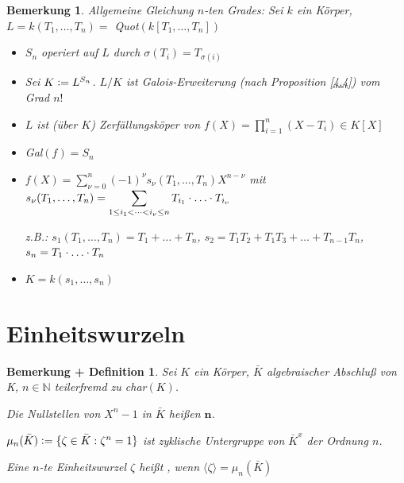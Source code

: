 \documentclass[a4paper,10pt,german]{scrbook}
\theoremstyle{saetze}
\theoremstyle{definitionen}
\newtheorem{Bem}[Def]{Bemerkung}
\newtheorem{BemDef}[Def]{Bemerkung + Definition}
\begin{document}
\begin{Bem}
Allgemeine Gleichung $n$-ten Grades: Sei $k$
ein Körper, $L = k(T_1,\dots,T_n) =$ Quot$(k[T_1,\dots,T_n])$

\begin{itemize}
\item $S_n$ operiert auf $L$ durch $\sigma(T_i) = T_{\sigma(i)}$

\item Sei $K\mathrel{\mathop:}= L^{S_n}$. $L/K$ ist Galois-Erweiterung (nach
Proposition \ref{4.4}) vom Grad $n!$

\item $L$ ist (über $K$) Zerfällungsköper von $f(X) =
\displaystyle \prod_{i=1}^n(X-T_i) \in K[X]$

\item Gal$(f) = S_n$

\item $f(X) = \displaystyle \sum_{\nu = 0}^n (-1)^{\nu} s_{\nu}
(T_1,\dots,T_n)X^{n-\nu}$ mit $s_{\nu}(T_1,\dots,T_n) =
\displaystyle \sum_{1\leq i_1 < \dots < i_{\nu} \leq n} T_{i_1} \cd \dots \cd 
T_{i_\nu}$

z.B.: $s_1(T_1,\dots,T_n) = T_1 + \dots + T_n$, $s_2 = T_1 T_2 + T_1
T_3 + \dots + T_{n-1}T_n$, $s_n = T_1 \cd \dots \cd T_n$

\item $K = k(s_1,\dots,s_n)$
\end{itemize}
\end{Bem}
\section{Einheitswurzeln}

\begin{BemDef}
\label{4.8}
Sei $K$ ein Körper, $\bar K$
algebraischer Abschluß von K, $n \in\mathbb{N}$ teilerfremd zu char$(K)$.

\begin{enum}
\item Die Nullstellen von $X^n - 1$ in $\bar K$ heißen
$\mathbf{n}$.

\item $\mu_n(\bar K) \mathrel{\mathop:}= \{\zeta \in \bar K: \zeta^n = 1\}$ ist
zyklische Untergruppe von ${\bar K}^x$ der Ordnung $n$.


\item Eine $n$-te Einheitswurzel $\zeta$ heißt , wenn
$\langle \zeta \rangle = \mu_n(\bar K)$
\end{enum}
\end{BemDef}
\end{document}
